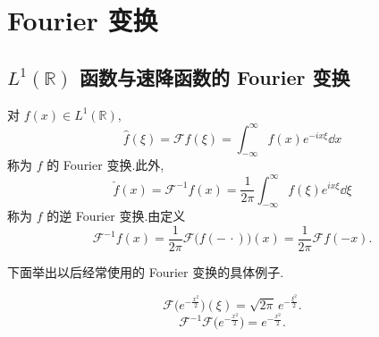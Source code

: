 \section{Fourier 变换}\label{sec:1.2}


\subsection{\texorpdfstring{$L^1(\mathbb{R})$ 函数与速降函数的 Fourier 变换}{L1(R) 函数与速降函数的 Fourier 变换}}\label{sec:1.2.1}

\begin{definition}\label{def:1.2.1}
对 $f(x) \in L^{1}(\mathbb{R})$,
\begin{equation*}
\hat{f}(\xi) = \mathcal{F}f(\xi) = \int_{-\infty}^{\infty} f(x)e^{-ix\xi}\dd x
\end{equation*}
称为 $f$ 的 Fourier 变换.此外,
\begin{equation*}
\check{f}(x) = \mathcal{F}^{-1}f(x) = \frac{1}{2\pi}\int_{-\infty}^{\infty} f(\xi)e^{ix\xi}\dd \xi
\end{equation*}
称为 $f$ 的逆 Fourier 变换.由定义
\begin{equation*}
\mathcal{F}^{-1}f(x) = \frac{1}{2\pi}\mathcal{F}\bigl(f(-\,\cdot)\bigr)(x) = \frac{1}{2\pi}\mathcal{F}f(-x).
\end{equation*}
\end{definition}

下面举出以后经常使用的 Fourier 变换的具体例子.

\begin{example}\label{exa:1.2.2}
\begin{equation}\tag{1.2.1}
\mathcal{F}\bigl(e^{-\frac{x^{2}}{2}}\bigr)(\xi) = \sqrt{2\pi}\,e^{-\frac{\xi^{2}}{2}}.
\label{eq:1.2.1}\end{equation}
\begin{equation}\tag{1.2.2}
\mathcal{F}^{-1}\mathcal{F}\bigl(e^{-\frac{x^{2}}{2}}\bigr) = e^{-\frac{x^{2}}{2}}.
\label{eq:1.2.2}\end{equation}
\end{example}

